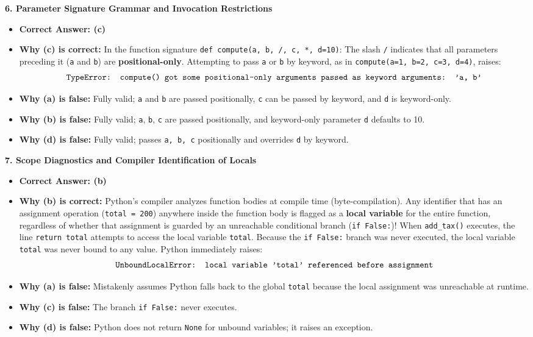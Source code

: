 \textbf{6. Parameter Signature Grammar and Invocation Restrictions}
\begin{itemize}
    \item \textbf{Correct Answer: (c)}
    \item \textbf{Why (c) is correct:}
    In the function signature \texttt{def compute(a, b, /, c, *, d=10)}:
    The slash \texttt{/} indicates that all parameters preceding it (\texttt{a} and \texttt{b}) are \textbf{positional-only}.
    Attempting to pass \texttt{a} or \texttt{b} by keyword, as in \texttt{compute(a=1, b=2, c=3, d=4)}, raises:
    \begin{equation*}
    \text{\texttt{TypeError: compute() got some positional-only arguments passed as keyword arguments: 'a, b'}}
    \end{equation*}
    \item \textbf{Why (a) is false:} Fully valid; \texttt{a} and \texttt{b} are passed positionally, \texttt{c} can be passed by keyword, and \texttt{d} is keyword-only.
    \item \textbf{Why (b) is false:} Fully valid; \texttt{a}, \texttt{b}, \texttt{c} are passed positionally, and keyword-only parameter \texttt{d} defaults to 10.
    \item \textbf{Why (d) is false:} Fully valid; passes \texttt{a, b, c} positionally and overrides \texttt{d} by keyword.
\end{itemize}

\textbf{7. Scope Diagnostics and Compiler Identification of Locals}
\begin{itemize}
    \item \textbf{Correct Answer: (b)}
    \item \textbf{Why (b) is correct:}
    Python's compiler analyzes function bodies at compile time (byte-compilation). Any identifier that has an assignment operation (\texttt{total = 200}) anywhere inside the function body is flagged as a \textbf{local variable} for the entire function, regardless of whether that assignment is guarded by an unreachable conditional branch (\texttt{if False:})!
    When \texttt{add\_tax()} executes, the line \texttt{return total} attempts to access the local variable \texttt{total}. Because the \texttt{if False:} branch was never executed, the local variable \texttt{total} was never bound to any value. Python immediately raises:
    \begin{equation*}
    \text{\texttt{UnboundLocalError: local variable 'total' referenced before assignment}}
    \end{equation*}
    \item \textbf{Why (a) is false:} Mistakenly assumes Python falls back to the global \texttt{total} because the local assignment was unreachable at runtime.
    \item \textbf{Why (c) is false:} The branch \texttt{if False:} never executes.
    \item \textbf{Why (d) is false:} Python does not return \texttt{None} for unbound variables; it raises an exception.
\end{itemize}


